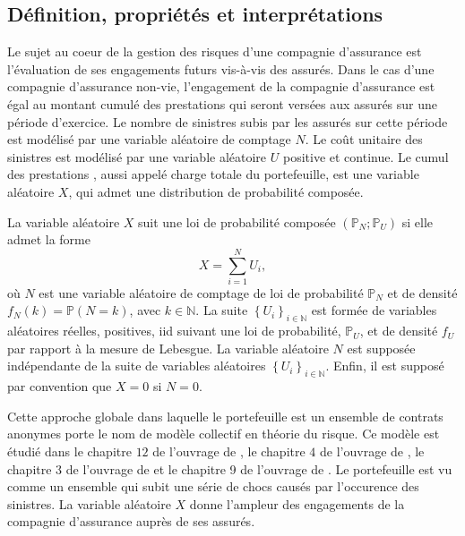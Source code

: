 \subsection{Définition, propriétés et interprétations}
Le sujet au coeur de la gestion des risques d\rq{}une compagnie d\rq{}assurance est l\rq{}évaluation de ses engagements futurs vis-à-vis des assurés. Dans le cas d\rq{}une compagnie d\rq{}assurance non-vie, l\rq{}engagement de la compagnie d\rq{}assurance est égal au montant cumulé des prestations qui seront versées aux assurés sur une période d\rq{}exercice. Le nombre de sinistres subis par les assurés sur cette période est modélisé par une variable aléatoire de comptage $N$. Le coût unitaire des sinistres est modélisé par une variable aléatoire $U$ positive et continue. Le cumul des prestations , aussi appelé charge totale du portefeuille, est une variable aléatoire $X$, qui admet une distribution de probabilité composée.    
\begin{Def}\label{CompoundDistributionDefinition}
La variable aléatoire $X$ suit une loi de probabilité composée $(\mathbb{P}_{N};\mathbb{P}_{U})$ si elle admet la forme
\begin{equation}\label{RandomVariableCompoundDistribution}
X=\sum_{i=1}^{N}U_{i},
\end{equation}
où $N$ est une variable aléatoire de comptage de loi de probabilité $\mathbb{P}_{N}$ et de densité $f_{N}(k)=\mathbb{P}(N=k)$, avec $k\in\mathbb{N}$. La suite $\left\{U_{i}\right\}_{i\in\mathbb{N}}$ est formée de variables aléatoires réelles, positives, \gls{iid} suivant une loi de probabilité, $\mathbb{P}_{U}$, et de densité $f_{U}$ par rapport à la mesure de Lebesgue. La variable aléatoire $N$ est supposée indépendante de la suite de variables aléatoires $\left\{U_{i}\right\}_{i\in\mathbb{N}}$. Enfin, il est supposé par convention que $X=0$ si $N=0$.
\end{Def}
Cette approche globale dans laquelle le portefeuille est un ensemble de contrats anonymes porte le nom de modèle collectif en théorie du risque. Ce modèle est étudié dans le chapitre $12$ de l\rq{}ouvrage de \citet{BoGeHiJoNe97}, le chapitre $4$ de l\rq{}ouvrage de \citet{RoScScTe99}, le chapitre $3$ de l\rq{}ouvrage de \citet{KaGoDhDe08} et le chapitre 9 de l\rq{}ouvrage de \citet{KlPaWi12}. Le portefeuille est vu comme un ensemble qui subit une série de chocs causés par l\rq{}occurence des sinistres. La variable aléatoire $X$ donne l\rq{}ampleur des engagements de la compagnie d\rq{}assurance auprès de ses assurés. \\ 

